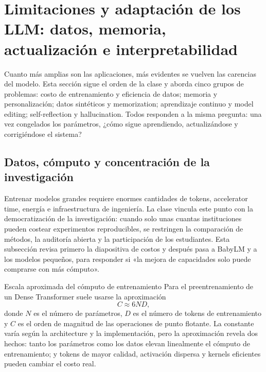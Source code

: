 \section{Limitaciones y adaptación de los LLM: datos, memoria, actualización e interpretabilidad}

Cuanto más amplias son las aplicaciones, más evidentes se vuelven las carencias del modelo. Esta sección sigue el orden de la clase y aborda cinco grupos de problemas: costo de entrenamiento y eficiencia de datos; memoria y personalización; datos sintéticos y memorization; aprendizaje continuo y model editing; self-reflection y hallucination. Todos responden a la misma pregunta: una vez congelados los parámetros, ¿cómo sigue aprendiendo, actualizándose y corrigiéndose el sistema?

\subsection{Datos, cómputo y concentración de la investigación}

Entrenar modelos grandes requiere enormes cantidades de tokens, accelerator time, energía e infraestructura de ingeniería. La clase vincula este punto con la democratización de la investigación: cuando solo unas cuantas instituciones pueden costear experimentos reproducibles, se restringen la comparación de métodos, la auditoría abierta y la participación de los estudiantes. Esta subsección revisa primero la diapositiva de costos y después pasa a BabyLM y a los modelos pequeños, para responder si «la mejora de capacidades solo puede comprarse con más cómputo».


\begin{importantbox}{Escala aproximada del cómputo de entrenamiento}
Para el preentrenamiento de un Dense Transformer suele usarse la aproximación
\[
C\approx 6ND,
\]
donde $N$ es el número de parámetros, $D$ es el número de tokens de entrenamiento y $C$ es el orden de magnitud de las operaciones de punto flotante. La constante varía según la architecture y la implementación, pero la aproximación revela dos hechos: tanto los parámetros como los datos elevan linealmente el cómputo de entrenamiento; y tokens de mayor calidad, activación dispersa y kernels eficientes pueden cambiar el costo real.
\end{importantbox}

